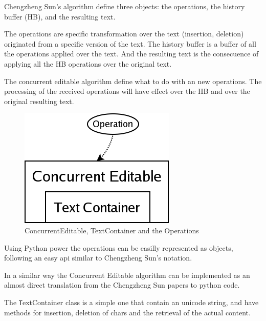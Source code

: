 \documentclass{article}
\begin{document}
Chengzheng Sun's algorithm define three objects: the operations, the history buffer (HB), and the resulting text.

The operations are specific transformation over the text (insertion, deletion) originated from a specific version of the text. The history buffer is a buffer of all the operations applied over the text. And the resulting text is the consecuence of applying all the HB operations over the original text.

The concurrent editable algorithm define what to do with an new operations. The processing of the received operations will have effect over the HB and over the original resulting text.


\begin{figure}[htbp]
 \begin{center}
    \includegraphics[angle=0,width=0.5\linewidth]{schemas/concurrent_editable.png}
 \end{center}
 \label{fig:concurrenteditable}
 \caption{ConcurrentEditable, TextContainer and the Operations}
\end{figure}


Using Python power the operations can be easilly represented as objects, following an easy api similar to Chengzheng Sun's notation.

In a similar way the Concurrent Editable algorithm can be implemented as an almost direct translation from the Chengzheng Sun papers to python code.

The {\texttt TextContainer } class is a simple one that contain an unicode string, and have methods for insertion, deletion of chars and the retrieval of the actual content.
\end{document}
